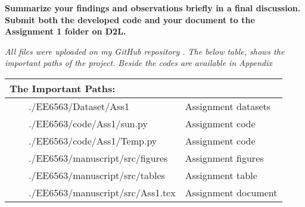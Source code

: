 \item \textbf{Summarize your findings and observations briefly in a final discussion. Submit both the developed code and your document to the Assignment 1 folder on D2L.}

\textit{All files were uploaded on my GitHub repository \cite{}. The below table, shows the important paths of the project. Beside the codes are available in Appendix }

\begin{table}[H]
\centering
\begin{tabular}{|l|l|}
\hline
\multicolumn{2}{|l|}{The Important Paths:        } \\ \hline
\ \ \ \    ./EE6563/Dataset/Ass1             & Assignment datasets\\ \hline
\ \ \ \    ./EE6563/code/Ass1/sun.py         & Assignment code\\ \hline
\ \ \ \    ./EE6563/code/Ass1/Temp.py        & Assignment code\\ \hline
\ \ \ \    ./EE6563/manuscript/src/figures   & Assignment figures\\ \hline
\ \ \ \    ./EE6563/manuscript/src/tables    & Assignment table\\ \hline
\ \ \ \    ./EE6563/manuscript/src/Ass1.tex  & Assignment document\\ \hline
\end{tabular}
\end{table}


